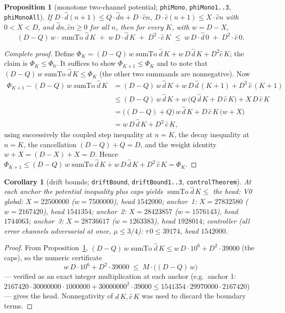 \documentclass[11pt]{article}
\newcommand{\dhat}{\widehat{d}}
\newcommand{\chat}{\widehat{c}}
\newcommand{\sumto}{\operatorname{sumTo}}
\theoremstyle{plain}
\newtheorem{proposition}[lemma]{Proposition}
\newtheorem{corollary}[lemma]{Corollary}
\theoremstyle{definition}
\begin{document}
\begin{proposition}[monotone two-channel potential; \texttt{phiMono}, \texttt{phiMono1..3}, \texttt{phiMonoAll}]\label{prop:potential}
If $D\cdot\dhat(n+1)\le Q\cdot\dhat n+D\cdot\chat n$, $D\cdot\chat(n+1)\le X\cdot\chat n$
with $0<X<D$, and $\dhat n,\chat n\ge 0$ for all $n$, then for every $K$, with $w=D-X$,
\[
(D-Q)\,w\cdot\sumto\dhat\,K\;+\;w\,D\cdot\dhat\,K\;+\;D^2\cdot\chat\,K
\;\le\;w\,D\cdot\dhat\,0\;+\;D^2\cdot\chat\,0 .
\]
\end{proposition}
\begin{proof}[Complete proof]
Define $\Phi_K=(D-Q)\,w\sumto\dhat\,K+w\,D\,\dhat\,K+D^2\chat\,K$;
the claim is $\Phi_K\le\Phi_0$. It suffices to show $\Phi_{K+1}\le\Phi_K$ and to note that
$(D-Q)\,w\sumto\dhat\,K\le\Phi_K$ (the other two summands are nonnegative). Now
\begin{align*}
\Phi_{K+1}-(D-Q)\,w\sumto\dhat\,K
&=(D-Q)\,w\,\dhat\,K+w\,D\,\dhat\,(K+1)+D^2\,\chat\,(K+1)\\
&\le(D-Q)\,w\,\dhat\,K+w\,\bigl(Q\,\dhat\,K+D\,\chat\,K\bigr)+X\,D\,\chat\,K\\
&=\bigl((D-Q)+Q\bigr)\,w\,\dhat\,K+D\,\chat\,K\,\bigl(w+X\bigr)\\
&=w\,D\,\dhat\,K+D^2\,\chat\,K ,
\end{align*}
using successively the coupled step inequality at $n=K$, the decay inequality at $n=K$,
the cancellation $(D-Q)+Q=D$, and the weight identity $w+X=(D-X)+X=D$. Hence
$\Phi_{K+1}\le (D-Q)\,w\sumto\dhat\,K+w\,D\,\dhat\,K+D^2\,\chat\,K=\Phi_K$.
\end{proof}

\begin{corollary}[drift bounds; \texttt{driftBound}, \texttt{driftBound1..3}, \texttt{controlTheorem}]\label{cor:bounds}
At each anchor the potential inequality plus caps yields $\sumto\dhat\,K\le$ the head:
V0 global: $X=22500000$ ($w=7500000$), head $1542000$;
anchor~1: $X=27832580$ ($w=2167420$), head $1541354$;
anchor~2: $X=28423857$ ($w=1576143$), head $1744063$;
anchor~3: $X=28736617$ ($w=1263383$), head $1928014$;
controller (all error channels adversarial at once, $\mu\le 3/4$):
$\tau\,0\le 39174$, head $1542000$.
\end{corollary}
\begin{proof}
From Proposition~\ref{prop:potential}, $(D-Q)\,w\sumto\dhat\,K\le w\,D\cdot 10^6+D^2\cdot 39000$
(the caps), so the numeric certificate
\[
w\,D\cdot 10^6+D^2\cdot 39000\;\le\;M\cdot\bigl((D-Q)\,w\bigr)
\]
--- verified as an exact integer multiplication at each anchor (e.g.\ anchor 1:
$2167420\cdot 30000000\cdot 1000000+30000000^2\cdot 39000\le 1541354\cdot 29970000\cdot 2167420$)
--- gives the head. Nonnegativity of $\dhat\,K,\chat\,K$ was used to discard the boundary terms.
\end{proof}
\end{document}

